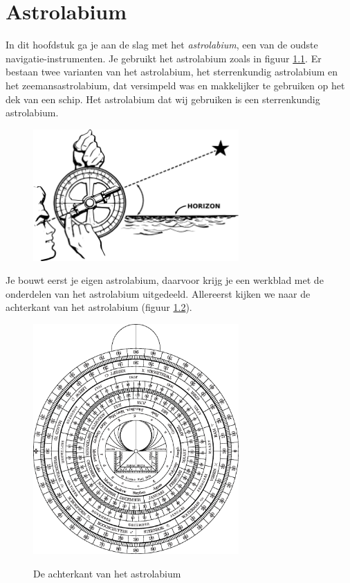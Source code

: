 \chapter{Astrolabium}

In dit hoofdstuk ga je aan de slag met het \textit{astrolabium}, een van de oudste navigatie-instrumenten. Je gebruikt het astrolabium zoals in figuur \ref{astrolabe-face}. Er bestaan twee varianten van het astrolabium, het sterrenkundig astrolabium en het zeemansastrolabium, dat versimpeld was en makkelijker te gebruiken op het dek van een schip. Het astrolabium dat wij gebruiken is een sterrenkundig astrolabium.

\begin{figure}
 \includegraphics[width=0.7\textwidth]{astrolabe-hi.png}
 \label{astrolabe-face}
\end{figure}

Je bouwt eerst je eigen astrolabium, daarvoor krijg je een werkblad met de onderdelen van het astrolabium uitgedeeld. Allereerst kijken we naar de achterkant van het astrolabium (figuur \ref{astrolabe-back}).

\begin{figure}
 \includegraphics[width=0.7\textwidth]{astrolabiumNL/mother_back.eps}
 \label{astrolabe-back}
 \caption{De achterkant van het astrolabium}
\end{figure}

